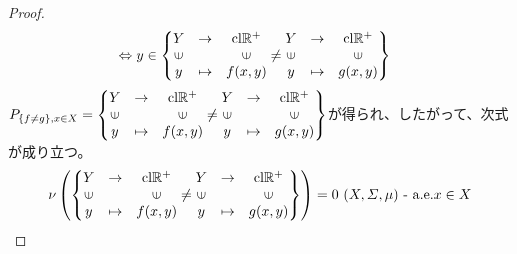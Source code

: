 \documentclass[dvipdfmx]{jsarticle}
\begin{document}
\begin{proof}
\begin{align*}
&\Leftrightarrow y \in \left\{ \begin{matrix}
Y & \rightarrow & \mathrm{cl}\mathbb{R}^{+} \\
\text{\rotatebox[origin=c]{90}{$\in$}} & & \text{\rotatebox[origin=c]{90}{$\in$}} \\
y & \mapsto & f(x,y) \\
\end{matrix} \neq \begin{matrix}
Y & \rightarrow & \mathrm{cl}\mathbb{R}^{+} \\
\text{\rotatebox[origin=c]{90}{$\in$}} & & \text{\rotatebox[origin=c]{90}{$\in$}} \\
y & \mapsto & g(x,y) \\
\end{matrix} \right\}
\end{align*}
$P_{\left\{ f \neq g \right\},x \in X} = \left\{ \begin{matrix}
Y & \rightarrow & \mathrm{cl}\mathbb{R}^{+} \\
\text{\rotatebox[origin=c]{90}{$\in$}} & & \text{\rotatebox[origin=c]{90}{$\in$}} \\
y & \mapsto & f(x,y) \\
\end{matrix} \neq \begin{matrix}
Y & \rightarrow & \mathrm{cl}\mathbb{R}^{+} \\
\text{\rotatebox[origin=c]{90}{$\in$}} & & \text{\rotatebox[origin=c]{90}{$\in$}} \\
y & \mapsto & g(x,y) \\
\end{matrix} \right\}$が得られ、したがって、次式が成り立つ。
\begin{align*}
\nu\left( \left\{ \begin{matrix}
Y & \rightarrow & \mathrm{cl}\mathbb{R}^{+} \\
\text{\rotatebox[origin=c]{90}{$\in$}} & & \text{\rotatebox[origin=c]{90}{$\in$}} \\
y & \mapsto & f(x,y) \\
\end{matrix} \neq \begin{matrix}
Y & \rightarrow & \mathrm{cl}\mathbb{R}^{+} \\
\text{\rotatebox[origin=c]{90}{$\in$}} & & \text{\rotatebox[origin=c]{90}{$\in$}} \\
y & \mapsto & g(x,y) \\
\end{matrix} \right\} \right) = 0\ (X,\varSigma,\mu) \ \text{-} \ \mathrm{a.e.}x \in X

\end{align*}
\end{proof}
\end{document}
